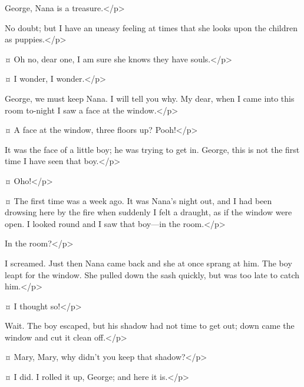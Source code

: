 \begin{drama}
\mrsdarlingspeaks
George, Nana is a treasure.</p>

\mrdarlingspeaks
No doubt; but I have an uneasy feeling at times that she looks upon the children as puppies.</p>

\mrsdarlingspeaks {}¤
Oh no, dear one, I am sure she knows they have souls.</p>

\mrdarlingspeaks {}¤
I wonder, I wonder.</p>


\mrsdarlingspeaks
George, we must keep Nana.
I will tell you why.
My dear, when I came into this room to-night I saw a face at the window.</p>

\mrdarlingspeaks {}¤
A face at the window, three floors up?
Pooh!</p>

\mrsdarlingspeaks
It was the face of a little boy; he was trying to get in.
George, this is not the first time I have seen that boy.</p>

\mrdarlingspeaks {}¤
Oho!</p>

\mrsdarlingspeaks {}¤
The first time was a week ago.
It was Nana's night out, and I had been drowsing here by the fire when suddenly I felt a draught, as if the window were open.
I looked round and I saw that boy—in the room.</p>

\mrdarlingspeaks
In the room?</p>

\mrsdarlingspeaks
I screamed.
Just then Nana came back and she at once sprang at him.
The boy leapt for the window.
She pulled down the sash quickly, but was too late to catch him.</p>

\mrdarlingspeaks {}¤
I thought so!</p>

\mrsdarlingspeaks
Wait.
The boy escaped, but his shadow had not time to get out; down came the window and cut it clean off.</p>

\mrdarlingspeaks {}¤
Mary, Mary, why didn't you keep that shadow?</p>

\mrsdarlingspeaks {}¤
I did.
I rolled it up, George; and here it is.</p>



\end{drama}
